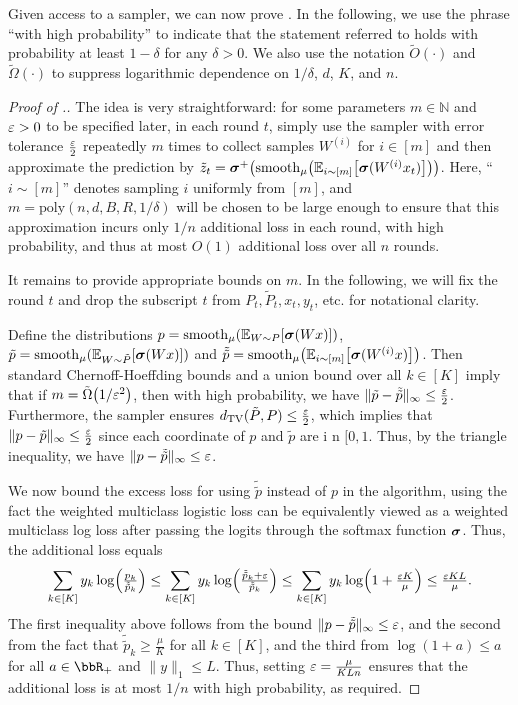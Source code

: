 Given access to a sampler, we can now prove . In the following, we use the phrase ``with high probability'' to indicate that the statement referred to holds with probability at least $1 - \delta$ for any $\delta > 0$. We also use the notation $\tilde{O}(\cdot)$ and $\tilde{\Omega}(\cdot)$ to suppress logarithmic dependence on $1/\delta$, $d$, $K$, and $n$.
\begin{proof}[Proof of .]
The idea is very straightforward: for some parameters $m \in \mathbb{N}$ and $\varepsilon > 0$ to be specified later, in each round $t$, simply use the sampler with error tolerance $\frac{\varepsilon}{2}$ repeatedly $m$ times to collect samples $W^{(i)}$ for $i \in [m]$ and then approximate the prediction by $\zt_t = \mb{\sigma}^{+}\prn*{\smooth\prn*{\En_{i \sim [m]}\brk*{\mb{\sigma}(W^{(i)}x_t)}}}$. Here, ``$i \sim [m]$'' denotes sampling $i$ uniformly from $[m]$, and $m = \text{poly}(n, d, B, R, 1/\delta)$ will be chosen to be large enough to ensure that this approximation incurs only $1/n$ additional loss in each round, with high probability, and thus at most $O(1)$ additional loss over all $n$ rounds.

\newcommand{\tp}{\tilde{p}}
\newcommand{\ttp}{\tilde{\tilde{p}}}

It remains to provide appropriate bounds on $m$. In the following, we will fix the round $t$ and drop the subscript $t$ from $P_t, \tilde{P}_t, x_t, y_t$, etc. for notational clarity. 

Define the distributions $p =\smooth\prn*{\En_{W \sim P}\brk*{\mb{\sigma}(Wx)}}$, $\tp = \smooth\prn*{\En_{W \sim \tilde{P}}\brk*{\mb{\sigma}(Wx)}}$ and $\ttp = \smooth\prn*{\En_{i \sim [m]}\brk*{\mb{\sigma}(W^{(i)}x)}}$. Then standard Chernoff-Hoeffding bounds and a union bound over all $k \in [K]$ imply that if $m = \tilde{\Omega}\prn*{1/\veps^2}$, then with high probability, we have $\|\tp - \ttp\|_\infty \leq \frac{\veps}{2}$. Furthermore, the sampler ensures $d_{\textrm{TV}}(\tilde{P}, P)\leq{} \frac{\varepsilon}{2}$, which implies that $\|p - \tp\|_\infty \leq \frac{\veps}{2}$ since each coordinate of $p$ and $\tp$ are i n $[0, 1$. Thus, by the triangle inequality, we have $\|p - \ttp\|_\infty \leq \veps$.

We now bound the excess loss for using $\ttp$ instead of $p$ in the algorithm, using the fact the weighted multiclass logistic loss can be equivalently viewed as a weighted multiclass log loss after passing the logits through the softmax function $\boldsymbol{\sigma}$. Thus, the additional loss equals
\[ \sum_{k \in [K]} y_k \log\prn*{\tfrac{p_k}{\ttp_k}} \leq \sum_{k \in [K]} y_k \log\prn*{\tfrac{\ttp_k + \veps}{\ttp_k}} \leq \sum_{k \in [K]} y_k \log\prn*{1 + \tfrac{\veps K}{\mu}} \leq \tfrac{\veps KL}{\mu}.\]
The first inequality above follows from the bound $\|p - \ttp\|_\infty \leq \veps$, and the second from the fact that $\ttp_k \geq \frac{\mu}{K}$ for all $k \in [K]$, and the third from $\log(1 + a) \leq a$ for all $a \in \R_+$ and $\|y\|_1 \leq L$. Thus, setting $\varepsilon = \frac{\mu}{KLn}$ ensures that the additional loss is at most $1/n$ with high probability, as required.
\end{proof}

